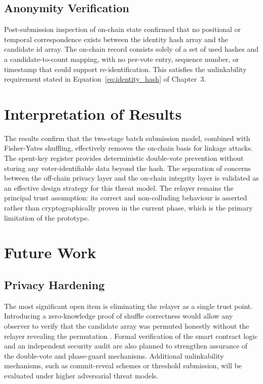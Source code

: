 \subsection{Anonymity Verification}
 
Post-submission inspection of on-chain state confirmed that no positional or temporal correspondence exists between the identity hash array and the candidate \gls{id} array. The on-chain record consists solely of a set of used hashes and a candidate-to-count mapping, with no per-vote entry, sequence number, or timestamp that could support re-identification. This satisfies the unlinkability requirement stated in Equation~\ref{eq:identity_hash} of Chapter~3.
 
\section{Interpretation of Results}
 
The results confirm that the two-stage batch submission model, combined with Fisher-Yates shuffling, effectively removes the on-chain basis for linkage attacks. The spent-key register provides deterministic double-vote prevention without storing any voter-identifiable data beyond the hash. The separation of concerns between the off-chain privacy layer and the on-chain integrity layer is validated as an effective design strategy for this threat model. The relayer remains the principal trust assumption: its correct and non-colluding behaviour is asserted rather than cryptographically proven in the current phase, which is the primary limitation of the prototype.
 
\section{Future Work}
 
\subsection{Privacy Hardening}
 
The most significant open item is eliminating the relayer as a single trust point. Introducing a zero-knowledge proof of shuffle correctness would allow any observer to verify that the candidate array was permuted honestly without the relayer revealing the permutation \cite{Wang2023}. Formal verification of the smart contract logic and an independent security audit are also planned to strengthen assurance of the double-vote and phase-guard mechanisms. Additional unlinkability mechanisms, such as commit-reveal schemes or threshold submission, will be evaluated under higher adversarial threat models.
 
